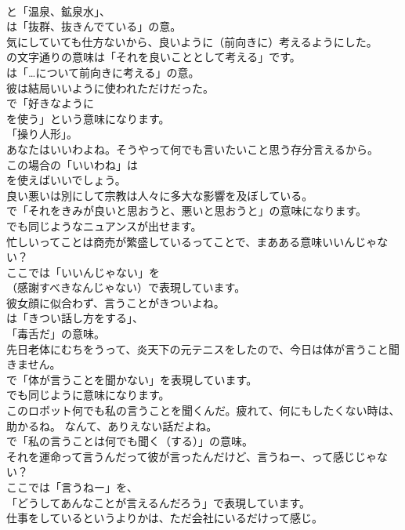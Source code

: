 \documentclass[8pt]{extreport}
\begin{document}
\begin{CJK}{UTF8}{min}
\\	と「温泉、鉱泉水」、
\\	は「抜群、抜きんでている」の意。	
\\	気にしていても仕方ないから、良いように（前向きに）考えるようにした。 
\\	の文字通りの意味は「それを良いこととして考える」です。
\\	は「…について前向きに考える」の意。	
\\	彼は結局いいように使われただけだった。 
\\	で「好きなように 
\\	を使う」という意味になります。
\\	「操り人形」。	
\\	あなたはいいわよね。そうやって何でも言いたいこと思う存分言えるから。 
\\	この場合の「いいわね」は 
\\	を使えばいいでしょう。	
\\	良い悪いは別にして宗教は人々に多大な影響を及ぼしている。 
\\	で「それをきみが良いと思おうと、悪いと思おうと」の意味になります。
\\	でも同じようなニュアンスが出せます。	
\\	忙しいってことは商売が繁盛しているってことで、まあある意味いいんじゃない？ 
\\	ここでは「いいんじゃない」を 
\\	（感謝すべきなんじゃない）で表現しています。	
\\	彼女顔に似合わず、言うことがきついよね。 
\\	は「きつい話し方をする」、
\\	「毒舌だ」の意味。	
\\	先日老体にむちをうって、炎天下の元テニスをしたので、今日は体が言うこと聞きません。 
\\	で「体が言うことを聞かない」を表現しています。
\\	でも同じように意味になります。	
\\	このロボット何でも私の言うことを聞くんだ。疲れて、何にもしたくない時は、助かるね。 なんて、ありえない話だよね。 
\\	で「私の言うことは何でも聞く（する）」の意味。	
\\	それを運命って言うんだって彼が言ったんだけど、言うねー、って感じじゃない？ 
\\	ここでは「言うねー」を、
\\	「どうしてあんなことが言えるんだろう」で表現しています。	
\\	仕事をしているというよりかは、ただ会社にいるだけって感じ。 

\end{CJK}
\end{document}
